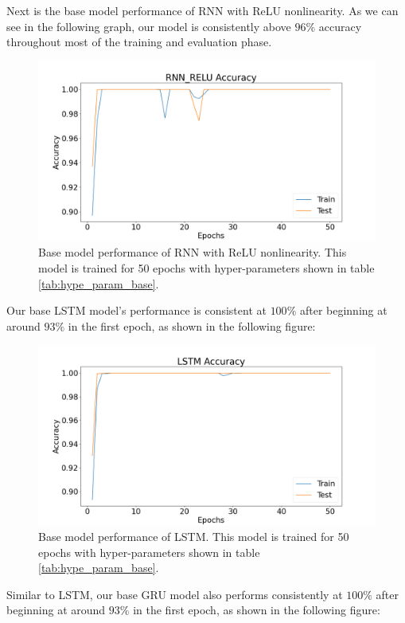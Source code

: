 Next is the base model performance of RNN with ReLU nonlinearity. As we can see in the following graph, our model is consistently above $96\%$ accuracy throughout most of the training and evaluation phase.

\begin{figure}[h]
	\centering
	\includegraphics[width=0.82\linewidth]{images/results/base_model/rnn_relu_accuracy.png}
	\caption[RNN\_ReLU base model performance]%
	{Base model performance of RNN with ReLU nonlinearity. This model is trained for 50 epochs with hyper-parameters shown in table \ref{tab:hype_param_base}.}
	\label{fig:rnn_relu_bm}
\end{figure}

Our base LSTM model's performance is consistent at $100\%$ after beginning at around $93\%$ in the first epoch, as shown in the following figure:

\begin{figure}[h]
	\centering
	\includegraphics[width=0.82\linewidth]{images/results/base_model/lstm_accuracy.png}
	\caption[LSTM base model performance]%
	{Base model performance of LSTM. This model is trained for 50 epochs with hyper-parameters shown in table \ref{tab:hype_param_base}.}
	\label{fig:lstm_bm}
\end{figure}

Similar to LSTM, our base GRU model also performs consistently at $100\%$ after beginning at around $93\%$ in the first epoch, as shown in the following figure:

